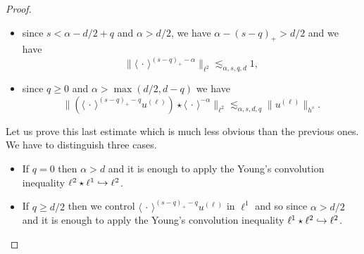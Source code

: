 \documentclass[JEP,XML,SOM,Unicode,NoEqCountersInSection,published]{cedram}
\newcommand\hto{\mathrel{\lhook\joinrel\to}}
\theoremstyle{definition}
\begin{document}
\begin{proof}
\begin{itemize}
\item
since $s<\alpha -d/2+q$ and $\alpha > d/2$, we have $\alpha-(s-q)_+> d/2$ and we have
\[
\| \langle \, \cdot \, \rangle^{(s-q)_+-\alpha} \|_{\ell^2} \lesssim_{\alpha,s,q,d} 1,
\]

\item
since $q \geq 0$ and $\alpha> \max(d/2,d-q)$ we have
\[
\| (\langle \, \cdot\,\rangle^{(s-q)_+-q} u^{(\ell)}) \star \langle \, \cdot \, \rangle^{-\alpha} \|_{\ell^2} \lesssim_{\alpha,s,d,q}\| u^{(\ell)} \|_{h^s}.
\]
\end{itemize}
Let us prove this last estimate which is much less obvious than the previous ones. We have to distinguish three cases.
\begin{itemize}
\item
If $q=0$ then $\alpha>d$ and it is enough to apply the Young's convolution inequality $\ell^2 \star \ell^1 \hto \ell^2$.

\item
If $q\geq d/2$ then we control $\langle \, \cdot\,\rangle^{(s-q)_+-q} u^{(\ell)}$ in $\ell^1$ and so since $\alpha>d/2$ and it is enough to apply the Young's convolution inequality $\ell^1 \star \ell^2 \hto \ell^2$.


\end{itemize}
\end{proof}
\end{document}
